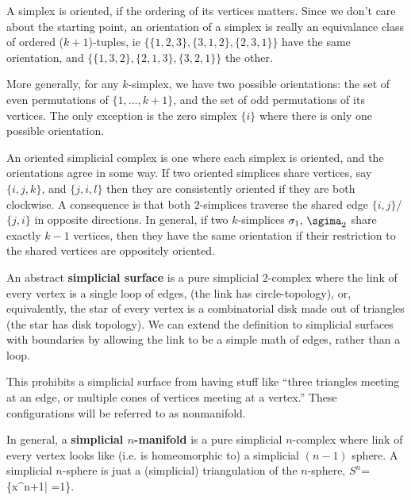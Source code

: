\begin{definition}
    A simplex is oriented, if the ordering of its vertices matters. Since we don't care about the starting point, an orientation of a simplex is really an equivalance class of ordered ($k+1$)-tuples, ie $\{ \{1,2,3\},  \{3,1,2\}, \{2,3,1\}\}$ have the same orientation, and  $\{ \{1,3,2\},  \{2,1,3\}, \{3,2,1\}\}$ the other.
    
    More generally, for any $k$-simplex, we have two possible orientations: the set of even permutations of $\{1,\dotsc,k+1\}$, and the set of odd permutations of its vertices. The only exception is the zero simplex $\{i\}$ where there is only one possible orientation.
    
    An oriented simplicial complex is one where each simplex is oriented, and the orientations agree in some way. If two oriented simplices share vertices, say $\{i,j,k\}$, and $\{j,i,l\}$ then they are consistently oriented if they are both clockwise. A consequence is that both $2$-simplices traverse the shared edge $\{i,j\}$/$\{j,i\}$ in opposite directions. In general, if two $k$-simplices $\sigma_1,\,\sgima_2$ share exactly $k-1$ vertices, then they have the same orientation if their restriction to the shared vertices are oppositely oriented.
\end{definition}

\begin{definition}
    An abstract \textbf{simplicial surface} is a pure simplicial $2$-complex where the link of every vertex is a single loop of edges, (the link has circle-topology), or, equivalently, the star of every vertex is a combinatorial disk made out of triangles (the star has disk topology). We can extend the definition to simplicial surfaces with boundaries by allowing the link to be a simple math of edges, rather than a loop.
    
\end{definition}

This prohibits a simplicial surface from having stuff like ``three triangles meeting at an edge, or multiple cones of vertices meeting at a vertex.'' These configurations will be referred to as nonmanifold.

\begin{definition}
    In general, a \textbf{simplicial $n$-manifold} is a pure simplicial $n$-complex where link of every vertex looks like  (i.e. is homeomorphic to) a simplicial $(n-1)$ sphere. A simplicial $n$-sphere is juat a (simplicial) triangulation of the $n$-sphere, $S^n$=\{x\in\R^{n+1}| =1\}.
    
\end{definition}
    
